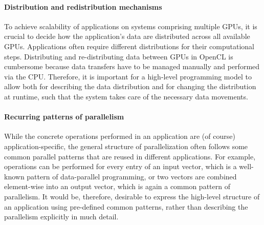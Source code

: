 \paragraph{Distribution and redistribution mechanisms}
To achieve scalability of applications on systems comprising multiple GPUs, it is crucial to decide how the application's data are distributed across all available GPUs.
Applications often require different distributions for their computational steps.
Distributing and re-distributing data between GPUs in OpenCL is cumbersome because data transfers have to be managed manually and performed via the CPU. 
Therefore, it is important for a high-level programming model to allow both for describing the data distribution and for changing the distribution at runtime, such that the system takes care of the necessary data movements.

\paragraph{Recurring patterns of parallelism}
While the concrete operations performed in an application are (of course) application-specific, the general structure of parallelization often follows some common parallel patterns that are reused in different applications.
For example, operations can be performed for every entry of an input vector, which is a well-known pattern of data-parallel programming, or two vectors are combined element-wise into an output vector, which is again a common pattern of parallelism.
It would be, therefore, desirable to express the high-level structure of an application using pre-defined common patterns, rather than describing the parallelism explicitly in much detail.

